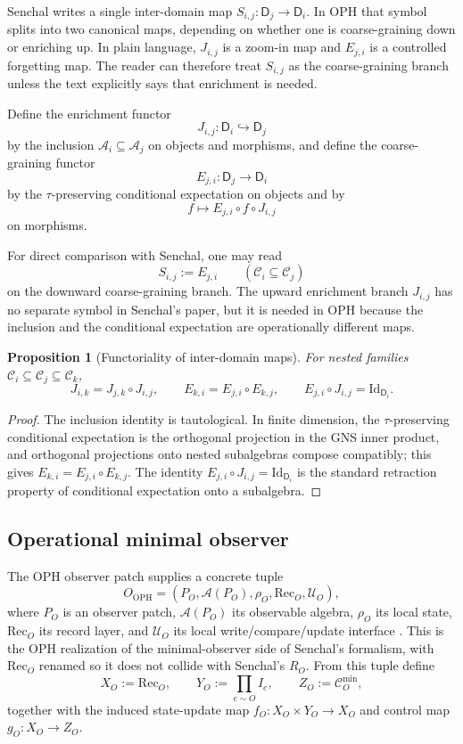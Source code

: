\documentclass[11pt]{article}
\newtheorem{proposition}[theorem]{Proposition}
\theoremstyle{remark}
\theoremstyle{plain}
\newcommand{\Rec}{\mathrm{Rec}}
\begin{document}
Senchal writes a single inter-domain map \(S_{i,j}:\mathsf D_j\to\mathsf D_i\). In OPH that symbol splits into two canonical maps, depending on whether one is coarse-graining down or enriching up. In plain language, \(J_{i,j}\) is a zoom-in map and \(E_{j,i}\) is a controlled forgetting map. The reader can therefore treat \(S_{i,j}\) as the coarse-graining branch unless the text explicitly says that enrichment is needed.

Define the enrichment functor
\[
J_{i,j}:\mathsf D_i\hookrightarrow \mathsf D_j
\]
by the inclusion \(\mathcal A_i\subseteq \mathcal A_j\) on objects and morphisms, and define the coarse-graining functor
\[
E_{j,i}:\mathsf D_j\to\mathsf D_i
\]
by the \(\tau\)-preserving conditional expectation on objects and by
\[
f\longmapsto E_{j,i}\circ f\circ J_{i,j}
\]
on morphisms.

For direct comparison with Senchal, one may read
\[
S_{i,j}:=E_{j,i}
\qquad
(\mathcal C_i\subseteq \mathcal C_j)
\]
on the downward coarse-graining branch. The upward enrichment branch \(J_{i,j}\) has no separate symbol in Senchal's paper, but it is needed in OPH because the inclusion and the conditional expectation are operationally different maps.

\begin{proposition}[Functoriality of inter-domain maps]
\label{prop:domainfunctors}
For nested families \(\mathcal C_i\subseteq \mathcal C_j\subseteq \mathcal C_k\),
\[
J_{i,k}=J_{j,k}\circ J_{i,j},
\qquad
E_{k,i}=E_{j,i}\circ E_{k,j},
\qquad
E_{j,i}\circ J_{i,j}=\mathrm{Id}_{\mathsf D_i}.
\]
\end{proposition}

\begin{proof}
The inclusion identity is tautological. In finite dimension, the \(\tau\)-preserving conditional expectation is the orthogonal projection in the GNS inner product, and orthogonal projections onto nested subalgebras compose compatibly; this gives \(E_{k,i}=E_{j,i}\circ E_{k,j}\). The identity \(E_{j,i}\circ J_{i,j}=\mathrm{Id}_{\mathsf D_i}\) is the standard retraction property of conditional expectation onto a subalgebra.
\end{proof}

\subsection{Operational minimal observer}

The OPH observer patch supplies a concrete tuple
\[
O_{\mathrm{OPH}}=(P_O,\mathcal A(P_O),\rho_O,\Rec_O,\mathcal U_O),
\]
where \(P_O\) is an observer patch, \(\mathcal A(P_O)\) its observable algebra, \(\rho_O\) its local state, \(\Rec_O\) its record layer, and \(\mathcal U_O\) its local write/compare/update interface \cite{ophmicrophysics}. This is the OPH realization of the minimal-observer side of Senchal's formalism, with \(\Rec_O\) renamed so it does not collide with Senchal's \(R_O\). From this tuple define
\[
X_O:=\Rec_O,\qquad
Y_O:=\prod_{e\sim O}I_e,\qquad
Z_O:=\mathcal C^{\min}_O,
\]
together with the induced state-update map \(f_O:X_O\times Y_O\to X_O\) and control map \(g_O:X_O\to Z_O\).
\end{document}

